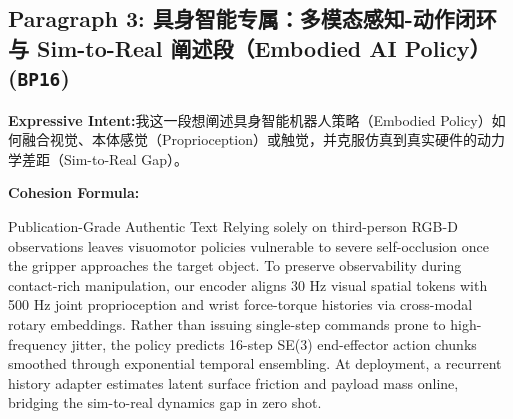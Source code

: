 \subsection*{Paragraph 3: 具身智能专属：多模态感知-动作闭环与 Sim-to-Real 阐述段（Embodied AI Policy） (\texttt{BP16})}
\noindent\textbf{Expressive Intent:}\enspace 我这一段想阐述具身智能机器人策略（Embodied Policy）如何融合视觉、本体感觉（Proprioception）或触觉，并克服仿真到真实硬件的动力学差距（Sim-to-Real Gap）。\par
\noindent\textbf{Cohesion Formula:}\par\vspace{4pt}
\begin{ExampleBox}{Publication-Grade Authentic Text}
Relying solely on third-person RGB-D observations leaves visuomotor policies vulnerable to severe self-occlusion once the gripper approaches the target object. To preserve observability during contact-rich manipulation, our encoder aligns 30 Hz visual spatial tokens with 500 Hz joint proprioception and wrist force-torque histories via cross-modal rotary embeddings. Rather than issuing single-step commands prone to high-frequency jitter, the policy predicts 16-step SE(3) end-effector action chunks smoothed through exponential temporal ensembling. At deployment, a recurrent history adapter estimates latent surface friction and payload mass online, bridging the sim-to-real dynamics gap in zero shot.
\end{ExampleBox}
